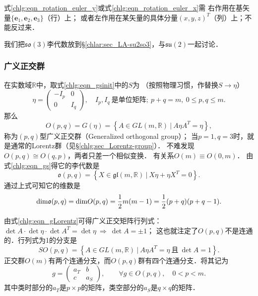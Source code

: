 式\eqref{chlg:eqn_rotation_euler_y}或式\eqref{chlg:eqn_rotation_euler_x}需
右作用在基矢量$\{\boldsymbol{e}_1,\boldsymbol{e}_2,\boldsymbol{e}_3\}$（行）上；
或者左作用在某矢量的具体分量$(x,y,z)^T$（列）上；不能反过来．

我们把$\mathfrak{so}(3)$李代数放到\S\ref{chlar:sec_LA-su2so3}，与$\mathfrak{su}(2)$一起讨论．

  

\subsubsection{广义正交群}\label{chlg:sec_Opq}
在实数域$\mathbb{R}$中，取式\eqref{chlg:eqn_gsinit}中的$S$为
（按照物理习惯，作替换$S\to \eta$）
\begin{equation}\label{chlg:eqn_generalized-Lorentz-metric}
    \eta = \begin{pmatrix}
        -I_p & 0 \\  0 & I_q
    \end{pmatrix},
    \quad I_p,I_q \  \text{是单位矩阵};\
    p+q=m,\ 0\leqslant p,q\leqslant m .
\end{equation}
那么
\begin{equation}\label{chlg:eqn_gLorentz}
    O(p,q)=G(\eta)= \left\{ A \in GL(m,\mathbb{R})\ |\ A \eta {A}^T =\eta \right\},
\end{equation}
称为$(p,q)$型{\heiti 广义正交群}（Generalized orthogonal group）；
当$p=1,q=3$时，就是通常的Lorentz群（见\S\ref{chlg:sec_Lorentz-group}）．
不难发现$O(p,q)\cong O(q,p)$，两者只差一个相似变换．
有关系$O(m)\equiv O(0,m)$．
由式\eqref{chlg:eqn_gs}得它的李代数是
\begin{equation}\label{chlg:eqn_LA-opq}
    \mathfrak{o}(p,q)= \left\{ X \in 
    \mathfrak{gl}(m,\mathbb{R})\ |\  X\eta + \eta {X}^T =0 \right\}.
\end{equation}
通过上式可知它的维数是
\begin{equation}
    {\rm dim} \mathfrak{o}(p,q) = {\rm dim} O(p,q) = 
    \frac{1}{2}m(m-1)=\frac{1}{2}(p+q)(p+q-1).
\end{equation}

由式\eqref{chlg:eqn_gLorentz}可得广义正交矩阵行列式：
$ \det A \cdot\det\eta\cdot \det A^T = \det \eta \ \Rightarrow \ \det A = \pm 1$；
这也就注定了$O(p,q)$不是连通的．行列式为1的分支是
\begin{equation}\label{chlg:eqn_LG-sopq}
    SO(p,q)= \left\{ A \in GL(m,\mathbb{R})\ |\ A \eta {A}^T =\eta 
    \ \text{且}\ \det A = 1 \right\} .
\end{equation}
正交群$O(m)$有两个连通分支，而$O(p,q)$群有四个连通分支．将其记为
\begin{equation}
    g=\begin{pmatrix}
        a_T & b \\ c & a_S
    \end{pmatrix},
    \qquad \forall g\in O(p,q) ,\quad 0 < p < m.
\end{equation}
其中类时部分的$a_T$是$p\times p$的矩阵，类空部分的$a_S$是$q\times q$的矩阵．



